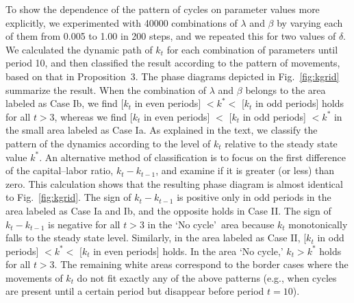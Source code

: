 \documentclass{MBE}%
\begin{document}
{%

To show the dependence of the pattern of cycles on parameter values more explicitly, we
experimented with 40000 combinations of $\lambda$ and $\beta$ by varying each of them from 0.005
to 1.00 in 200 steps, and we repeated this for two values of $\delta$. We calculated the dynamic
path of $k_{t}$ for each combination of parameters until period 10, and then classified the result
according to the pattern of movements, based on that in Proposition~3. The phase diagrams depicted
in Fig.\ \ref{fig:kgrid} summarize the result. When the combination of $\lambda$ and $\beta$
belongs to the area labeled as Case Ib, we find [$k_{t}$ in even periods] $<k^{\ast}<$ [$k_{t}$ in
odd periods] holds for all $t>3$, whereas we find [$k_{t}$ in even periods] $<$ [$k_{t}$ in odd
periods] $<k^{\ast}$ in the small area labeled as Case Ia. {As explained in the text, we classify
the pattern of the dynamics according to the level of $k_{t}$ relative to the steady state value
$k^{\ast}$. An alternative method of classification is to focus on the first difference of the
capital--labor ratio, $k_{t}-k_{t-1}$, and examine if it is greater (or less) than zero. This
calculation shows that the resulting phase diagram is almost identical to Fig.\ \ref{fig:kgrid}.
The sign of $k_{t}-k_{t-1}$ is positive only in odd periods in the area labeled as Case Ia and Ib,
and the opposite holds in Case II. The sign of $k_{t}-k_{t-1}$ is negative for all $t>3$ in the
`No cycle'\ area because $k_{t}$ monotonically falls to the steady state level.} Similarly, in the
area labeled as Case II, [$k_{t}$ in odd periods] $<k^{\ast}<$ [$k_{t}$ in even periods] holds. In
the area `No cycle,' $k_{t}>k^{\ast}$ holds for all $t>3$. The remaining white areas correspond to
the border cases where the movements of $k_{t}$ do not fit exactly any of the above patterns
(e.g., when cycles are present until a certain period but disappear before period $t=10$).

}
\end{document}
